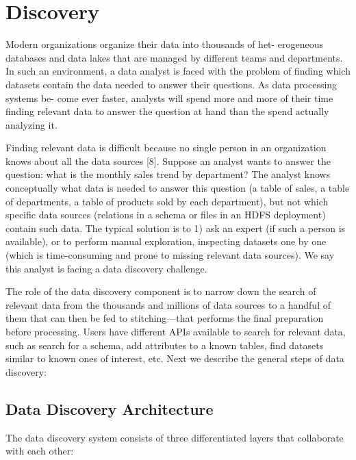 \section{Discovery}
\label{sec:discovery}


Modern organizations organize their data into thousands of het- erogeneous
databases and data lakes that are managed by different teams and departments. In
such an environment, a data analyst is faced with the problem of finding which
datasets contain the data needed to answer their questions. As data processing
systems be- come ever faster, analysts will spend more and more of their time
finding relevant data to answer the question at hand than the spend actually
analyzing it.

Finding relevant data is difficult because no single person in an organization
knows about all the data sources [8]. Suppose an analyst wants to answer the
question: what is the monthly sales trend by department? The analyst knows
conceptually what data is needed to answer this question (a table of sales, a
table of departments, a table of products sold by each department), but not
which specific data sources (relations in a schema or files in an HDFS
deployment) contain such data. The typical solution is to 1) ask an expert (if
such a person is available), or to perform manual exploration, inspecting
datasets one by one (which is time-consuming and prone to missing relevant data
sources). We say this analyst is facing a data discovery challenge.

The role of the data discovery component is to narrow down the search of
relevant data from the thousands and millions of data sources to a handful of
them that can then be fed to stitching---that performs the final preparation
before processing. Users have different APIs available to search for relevant
data, such as search for a schema, add attributes to a known tables, find
datasets similar to known ones of interest, etc. Next we describe the general
steps of data discovery:

\subsection{Data Discovery Architecture}

The data discovery system consists of three differentiated layers that
collaborate with each other:

